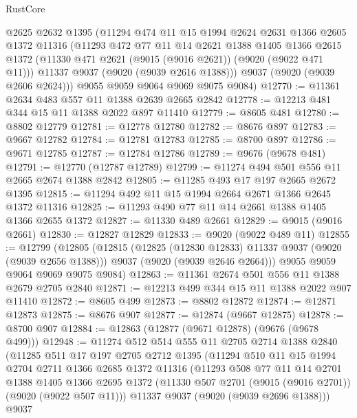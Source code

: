 \begin{lexlean}{RustCore}
\begin{coremodule}
      @2625
      @2632
      @1395
      (@11294
        @474
        @11
        @15
        @1994
        @2624
        @2631
        @1366
        @2605
        @1372
        @11316
        (@11293
          @472
          @77
          @11
          @14
          @2621
          @1388
          @1405
          @1366
          @2615
          @1372
          (@11330 @471 @2621 (@9015 (@9016 @2621)) (@9020 (@9022 @471 @11)))
          @11337
          @9037
          (@9020 (@9039 @2616 @1388)))
        @9037
        (@9020 (@9039 @2606 @2624)))
      @9055
      @9059
      @9064
      @9069
      @9075
      @9084)
@12770 := @11361 @2634 @483 @557 @11 @1388 @2639 @2665 @2842
@12778 := @12213 @481 @344 @15 @11 @1388 @2022 @897 @11410
@12779 := @8605 @481
@12780 := @8802 @12779
@12781 := @12778 @12780
@12782 := @8676 @897
@12783 := @9667 @12782
@12784 := @12781 @12783
@12785 := @8700 @897
@12786 := @9671 @12785
@12787 := @12784 @12786
@12789 := @9676 (@9678 @481)
@12791 := @12770 (@12787 @12789)
@12799 := @11274 @494 @501 @556 @11 @2665 @2674 @1388 @2842
@12805 := @11285 @493 @17 @197 @2665 @2672 @1395
@12815 := @11294 @492 @11 @15 @1994 @2664 @2671 @1366 @2645 @1372 @11316
@12825 := @11293 @490 @77 @11 @14 @2661 @1388 @1405 @1366 @2655 @1372
@12827 := @11330 @489 @2661
@12829 := @9015 (@9016 @2661)
@12830 := @12827 @12829
@12833 := @9020 (@9022 @489 @11)
@12855 := @12799
    (@12805
      (@12815
        (@12825 (@12830 @12833) @11337 @9037 (@9020 (@9039 @2656 @1388)))
        @9037
        (@9020 (@9039 @2646 @2664)))
      @9055
      @9059
      @9064
      @9069
      @9075
      @9084)
@12863 := @11361 @2674 @501 @556 @11 @1388 @2679 @2705 @2840
@12871 := @12213 @499 @344 @15 @11 @1388 @2022 @907 @11410
@12872 := @8605 @499
@12873 := @8802 @12872
@12874 := @12871 @12873
@12875 := @8676 @907
@12877 := @12874 (@9667 @12875)
@12878 := @8700 @907
@12884 := @12863 (@12877 (@9671 @12878) (@9676 (@9678 @499)))
@12948 := @11274
    @512
    @514
    @555
    @11
    @2705
    @2714
    @1388
    @2840
    (@11285
      @511
      @17
      @197
      @2705
      @2712
      @1395
      (@11294
        @510
        @11
        @15
        @1994
        @2704
        @2711
        @1366
        @2685
        @1372
        @11316
        (@11293
          @508
          @77
          @11
          @14
          @2701
          @1388
          @1405
          @1366
          @2695
          @1372
          (@11330 @507 @2701 (@9015 (@9016 @2701)) (@9020 (@9022 @507 @11)))
          @11337
          @9037
          (@9020 (@9039 @2696 @1388)))
        @9037

\end{coremodule}
\end{lexlean}
